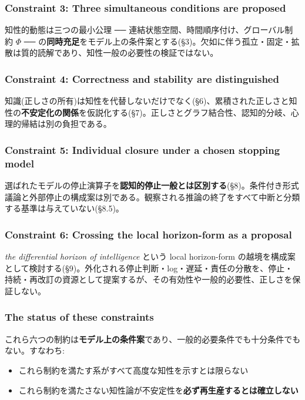 \subsubsection{Constraint 3: Three simultaneous conditions are proposed}


知性的動態は三つの最小公理 ── 連結状態空間、時間順序付け、グローバル制約 $\Phi$ ── の\textbf{同時充足}をモデル上の条件案とする(\S{}3)。欠如に伴う孤立・固定・拡散は質的読解であり、知性一般の必要性の検証ではない。

\subsubsection{Constraint 4: Correctness and stability are distinguished}


知識(正しさの所有)は知性を代替しないだけでなく(\S{}6)、累積された正しさと知性の\textbf{不安定化の関係}を仮説化する(\S{}7)。正しさとグラフ結合性、認知的分岐、心理的帰結は別の負担である。

\subsubsection{Constraint 5: Individual closure under a chosen stopping model}


選ばれたモデルの停止演算子を\textbf{認知的停止一般とは区別する}(\S{}8)。条件付き形式議論と外部停止の構成案は別である。観察される推論の終了をすべて中断と分類する基準は与えていない(\S{}8.5)。

\subsubsection{Constraint 6: Crossing the local horizon-form as a proposal}


\emph{the differential horizon of intelligence} という local horizon-form の越境を構成案として検討する(\S{}9)。外化される停止判断・log・遅延・責任の分散を、停止・持続・再改訂の資源として提案するが、その有効性や一般的必要性、正しさを保証しない。

\subsubsection{The status of these constraints}


これら六つの制約は\textbf{モデル上の条件案}であり、一般的必要条件でも十分条件でもない。すなわち:

\begin{itemize}
\item これら制約を満たす系がすべて高度な知性を示すとは限らない
\item これら制約を満たさない知性論が不安定性を\textbf{必ず再生産するとは確立しない}
\end{itemize}

